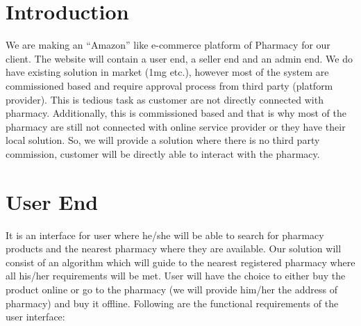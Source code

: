 \documentclass[fleqn,10pt]{../SelfArx} %
\affiliation{\textit{D-Enigma (Group - CS 01)}} %
\affiliation{\textit{Indian Institute of Information Technology, Vadodara.}} %
\begin{document}
\sffamily
\flushbottom %

\maketitle %

\tableofcontents %

\thispagestyle{empty} %


\section*{Introduction} %


We are making an “Amazon” like e-commerce platform of Pharmacy for our client. The website will contain a user end, a seller end and an admin end. We do have existing solution in market (1mg etc.), however most of the system are commissioned based and require approval process from third party (platform provider). This is tedious task as customer are not directly connected with pharmacy. Additionally, this is commissioned based and that is why most of the pharmacy are still not connected with online service provider or they have their local solution. So, we will provide a solution where there is no third party commission, customer will be directly able to interact with the pharmacy.


\section{User End}

It is an interface for user where he/she will be able to search for pharmacy products and the nearest pharmacy where they are available. Our solution will consist of an algorithm which will guide to the nearest registered pharmacy where all his/her requirements will be met. User will have the choice to either buy the product online or go to the pharmacy (we will provide him/her the address of pharmacy) and buy it offline. Following are the functional requirements of the user interface:
\end{document}
